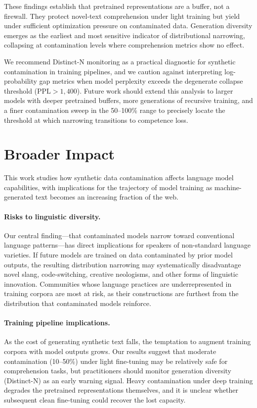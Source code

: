 \documentclass{article}
\begin{document}
These findings establish that pretrained representations are a buffer, not a firewall.
They protect novel-text comprehension under light training but yield under sufficient optimization pressure on contaminated data.
Generation diversity emerges as the earliest and most sensitive indicator of distributional narrowing, collapsing at contamination levels where comprehension metrics show no effect.

We recommend Distinct-N monitoring as a practical diagnostic for synthetic contamination in training pipelines, and we caution against interpreting log-probability gap metrics when model perplexity exceeds the degenerate collapse threshold ($\text{PPL} > 1{,}400$).
Future work should extend this analysis to larger models with deeper pretrained buffers, more generations of recursive training, and a finer contamination sweep in the 50--100\% range to precisely locate the threshold at which narrowing transitions to competence loss.

\section*{Broader Impact}

This work studies how synthetic data contamination affects language model capabilities, with implications for the trajectory of model training as machine-generated text becomes an increasing fraction of the web.

\paragraph{Risks to linguistic diversity.}
Our central finding---that contaminated models narrow toward conventional language patterns---has direct implications for speakers of non-standard language varieties.
If future models are trained on data contaminated by prior model outputs, the resulting distribution narrowing may systematically disadvantage novel slang, code-switching, creative neologisms, and other forms of linguistic innovation.
Communities whose language practices are underrepresented in training corpora are most at risk, as their constructions are furthest from the distribution that contaminated models reinforce.

\paragraph{Training pipeline implications.}
As the cost of generating synthetic text falls, the temptation to augment training corpora with model outputs grows.
Our results suggest that moderate contamination (10--50\%) under light fine-tuning may be relatively safe for comprehension tasks, but practitioners should monitor generation diversity (Distinct-N) as an early warning signal.
Heavy contamination under deep training degrades the pretrained representations themselves, and it is unclear whether subsequent clean fine-tuning could recover the lost capacity.
\end{document}
